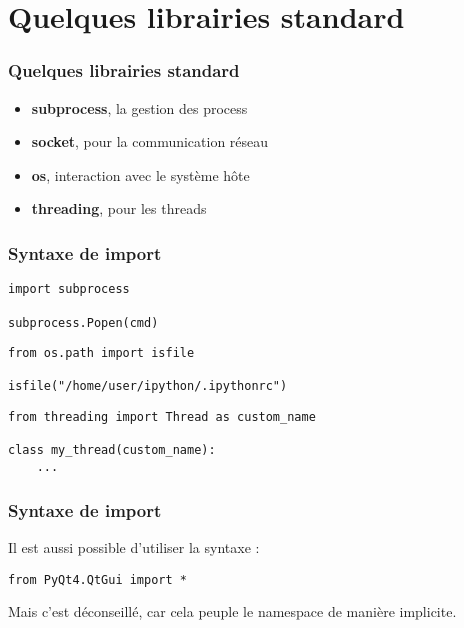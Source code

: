 \section{Quelques librairies standard}
\begin{frame}[fragile]
  \frametitle{Quelques librairies standard}
  \begin{itemize}
    \item<1-> {\bf subprocess}, la gestion des process
    \item<2-> {\bf socket}, pour la communication réseau
    \item<3-> {\bf os}, interaction avec le système hôte
    \item<4-> {\bf threading}, pour les threads
  \end{itemize}
\end{frame}

\begin{frame}[fragile]
  \frametitle{Syntaxe de import}
  \begin{lstlisting}
import subprocess

subprocess.Popen(cmd)
  \end{lstlisting}

  \begin{lstlisting}
from os.path import isfile

isfile("/home/user/ipython/.ipythonrc")
  \end{lstlisting}

  \begin{lstlisting}
from threading import Thread as custom_name

class my_thread(custom_name):
    ...
  \end{lstlisting}
\end{frame}

\begin{frame}[fragile]
  \frametitle{Syntaxe de import}
Il est aussi possible d'utiliser la syntaxe :
  \begin{lstlisting}
from PyQt4.QtGui import *
  \end{lstlisting}
Mais c'est déconseillé, car cela peuple le namespace de manière implicite.
\end{frame}
